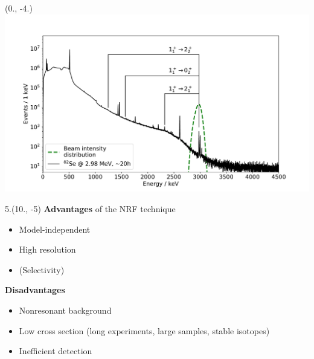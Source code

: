 \begin{textblock}{9.5}(0., -4.)
    \includegraphics[width=\textwidth, trim=50 0 50 50,clip]{figures/se82_spectrum_branchings.pdf}
\end{textblock}

\begin{textblock}{5.}(10., -5)
    \color{green}\textbf{Advantages} \color{black} of the NRF technique
    \begin{itemize}
        \item Model-independent
        \item High resolution
        \item (Selectivity)
    \end{itemize}
    
    \color{red}\textbf{Disadvantages}\color{black}
    \begin{itemize}
        \item Nonresonant background
        \item Low cross section (long experiments, large samples, stable isotopes)
        \item Inefficient detection
    \end{itemize}
\end{textblock}